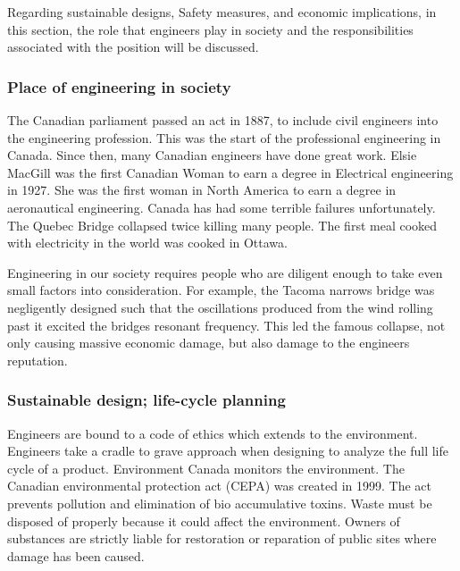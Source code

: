 \documentclass[12pt,a4paper]{report}
\begin{document}
 Regarding sustainable designs, Safety measures, and economic implications, in this section, the role that engineers play in society and the responsibilities associated with the position will be discussed. 

    \subsubsection{Place of engineering in society}
    
    The Canadian parliament passed an act in 1887, to include civil engineers into the engineering profession. This was the start of the professional engineering in Canada. Since then, many Canadian engineers have done great work. Elsie MacGill was the first Canadian Woman to earn a degree in Electrical engineering in 1927. She was the first woman in North America to earn a degree in aeronautical engineering. Canada has had some terrible failures unfortunately. The Quebec Bridge collapsed twice killing many people. The first meal cooked with electricity in the world was cooked in Ottawa. \par
    
    Engineering in our society requires people who are diligent enough to take even small factors into consideration. For example, the Tacoma narrows bridge was negligently designed such that the oscillations produced from the wind rolling past it excited the bridges resonant frequency. This led the famous collapse, not only causing massive economic damage, but also damage to the engineers reputation.
    
    
    
    \subsubsection{Sustainable design; life-cycle planning}
    
    Engineers are bound to a code of ethics which extends to the environment. Engineers take a cradle to grave approach when designing to analyze the full life cycle of a product. Environment Canada monitors the environment.  The Canadian environmental protection act (CEPA) was created in 1999. The act prevents pollution and elimination of bio accumulative toxins. Waste must be disposed of properly because it could affect the environment.  Owners of substances are strictly liable for restoration or reparation of public sites where damage has been caused.\par
    
\end{document}
